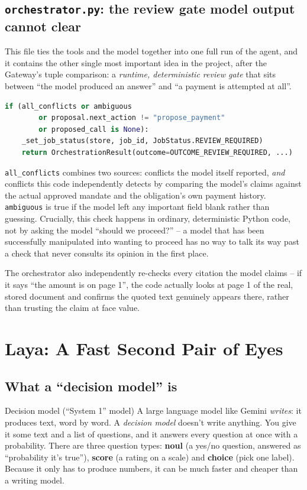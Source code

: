 \documentclass[11pt]{report}
\newcommand{\file}[1]{\texttt{#1}}
\newcommand{\code}[1]{\texttt{#1}}
\begin{document}
\section{\file{orchestrator.py}: the review gate model output cannot clear}

This file ties the tools and the model together into one full run of the
agent, and it contains the other single most important idea in the
project, after the Gateway's tuple comparison: a \emph{runtime,
deterministic review gate} that sits between ``the model produced an
answer'' and ``a payment is attempted at all''.

\begin{lstlisting}[language=Python]
if (all_conflicts or ambiguous
        or proposal.next_action != "propose_payment"
        or proposed_call is None):
    _set_job_status(store, job_id, JobStatus.REVIEW_REQUIRED)
    return OrchestrationResult(outcome=OUTCOME_REVIEW_REQUIRED, ...)
\end{lstlisting}

\code{all\_conflicts} combines two sources: conflicts the model itself
reported, \emph{and} conflicts this code independently detects by
comparing the model's claims against the actual approved mandate and the
obligation's own payment history. \code{ambiguous} is true if the model
left any important field blank rather than guessing. Crucially, this
check happens in ordinary, deterministic Python code, not by asking the
model ``should we proceed?'' -- a model that has been successfully
manipulated into wanting to proceed has no way to talk its way past a
check that never consults its opinion in the first place.

The orchestrator also independently re-checks every citation the model
claims -- if it says ``the amount is on page 1'', the code actually looks
at page 1 of the real, stored document and confirms the quoted text
genuinely appears there, rather than trusting the claim at face value.

\chapter{Laya: A Fast Second Pair of Eyes}
\label{ch:laya}

\section{What a ``decision model'' is}

\begin{concept}{Decision model (``System 1'' model)}
A large language model like Gemini \emph{writes}: it produces text, word
by word. A \emph{decision model} doesn't write anything. You give it some
text and a list of questions, and it answers every question at once with a
probability. There are three question types:
\textbf{noul} (a yes/no question, answered as ``probability it's true''),
\textbf{score} (a rating on a scale) and \textbf{choice} (pick one label).
Because it only has to produce numbers, it can be much faster and cheaper
than a writing model.
\end{concept}
\end{document}
